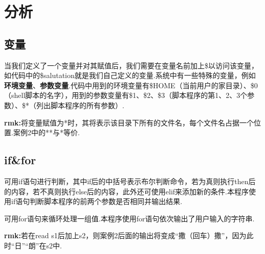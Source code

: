 \documentclass{ctexart}
\begin{document}
\section{分析}

\subsection{变量}

当我们定义了一个变量并对其赋值后，我们需要在变量名前加上\$以访问该变量，如代码中的\$salutation就是我们自己定义的变量.系统中有一些特殊的变量，例如\textbf{环境变量}、\textbf{参数变量}.代码中用到的环境变量有\$HOME（当前用户的家目录）、\$0（shell脚本的名字），用到的参数变量有\$1、\$2、\$3（脚本程序的第1、2、3个参数）、\$*（列出脚本程序的所有参数）.

\textbf{rmk:}将变量赋值为*时，其将表示该目录下所有的文件名，每个文件名占据一个位置.案例2中的**与*等价.

\subsection{if\&for}

可用if语句进行判断，其中if后的中括号表示布尔判断命令，若为真则执行then后的内容，若不真则执行else后的内容，此外还可使用elif来添加新的条件.本程序使用if语句判断脚本程序的前两个参数是否相同并输出结果.

可用for语句来循环处理一组值.本程序使用for语句依次输出了用户输入的字符串.

\textbf{rmk:}若在read s1后加上s2，则案例2后面的输出将变成“撒（回车）撒”，因为此时“日”“朗”在s2中.
\end{document}
